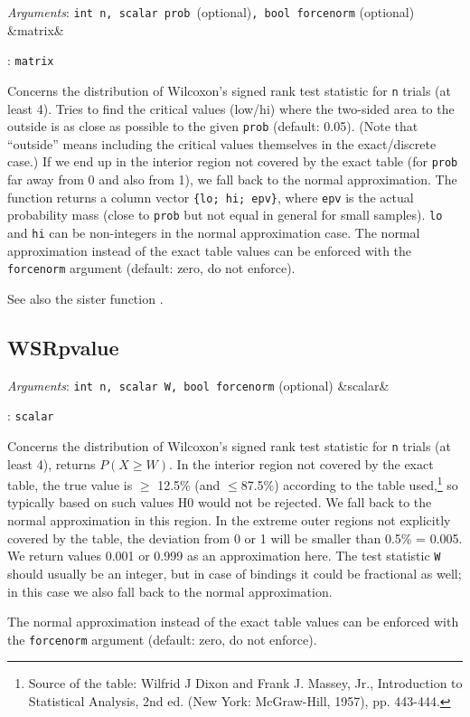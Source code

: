 \documentclass[11pt,english]{article}
\newcommand{\ArgRet}[2]{%
  {\it Arguments}: {#1}%
  \ifx&#2&%
  \else
  \par\smallskip\noindent {\it Return type}: \texttt{#2}
  \fi%
  \par\medskip\par%
  }
\begin{document}
\ArgRet{\texttt{int n, scalar prob }(optional)\texttt{, bool forcenorm}
(optional)}{matrix}

Concerns the distribution of Wilcoxon's signed rank test statistic for
\texttt{n} trials (at least 4). Tries to find the critical values
(low/hi) where the two-sided area to the outside is as close as
possible to the given \texttt{prob} (default: 0.05). (Note that
``outside'' means including the critical values themselves in the
exact/discrete case.) If we end up in the interior region not covered
by the exact table (for \texttt{prob} far away from 0 and also from
1), we fall back to the normal approximation. The function returns a
column vector \verb|{lo; hi; epv}|, where \texttt{epv} is the actual
probability mass (close to \texttt{prob} but not equal in general for
small samples). \texttt{lo} and \texttt{hi} can be non-integers in the normal
approximation case. The normal approximation instead of the exact
table values can be enforced with the \texttt{forcenorm} argument
(default: zero, do not enforce).

See also the sister function .

\subsection{WSRpvalue}

\ArgRet{\texttt{int n, scalar W, bool forcenorm} (optional)}{scalar}

Concerns the distribution of Wilcoxon's signed rank test statistic for
\texttt{n} trials (at least 4), returns $P(X\geq W)$. In the interior
region not covered by the exact table, the true value is $\geq$ 12.5\%
(and $\leq$87.5\%) according to the table used,\footnote{Source of the
  table: Wilfrid J Dixon and Frank J. Massey, Jr., Introduction to
  Statistical Analysis, 2nd ed. (New York: McGraw-Hill, 1957), pp.
  443-444.} so typically based on such values H0 would not be
rejected. We fall back to the normal approximation in this region. In
the extreme outer regions not explicitly covered by the table, the
deviation from 0 or 1 will be smaller than 0.5\% = 0.005. We return
values 0.001 or 0.999 as an approximation here. The test statistic
\texttt{W} should usually be an integer, but in case of bindings it
could be fractional as well; in this case we also fall back to the
normal approximation.

The normal approximation instead of the exact table values can be
enforced with the \texttt{forcenorm} argument (default: zero, do not
enforce).
\end{document}
